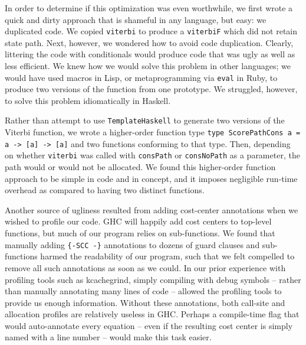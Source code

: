 \documentclass[preprint]{sigplanconf}
\begin{document}
In order to determine if this optimization was even worthwhile, we first wrote 
a quick and dirty approach that is shameful in any language, but easy: we 
duplicated code. We copied \texttt{viterbi} to produce a \texttt{viterbiF} 
which did not retain state path. Next, however, we wondered how to avoid code 
duplication. Clearly, littering the code with conditionals would produce code 
that was ugly as well as less efficient. We knew how we would solve this 
problem in other languages; we would have used macros in Lisp, or 
metaprogramming via \texttt{eval} in Ruby, to produce two versions of the 
function from one prototype. We struggled, however, to solve this problem 
idiomatically in Haskell.

Rather than attempt to use \texttt{TemplateHaskell} to generate two versions of 
the Viterbi function, we wrote a higher-order function type 
\lstinline!type ScorePathCons a = a -> [a] -> [a]! and two functions conforming to that type. 
Then, depending on whether \texttt{viterbi} was called with \texttt{consPath} 
or \texttt{consNoPath} as a parameter, the path would or would not be 
allocated. We found this higher-order function approach to be simple in code 
and in concept, and it imposes negligible run-time overhead as compared to 
having two distinct functions.



Another source of ugliness resulted from adding cost-center annotations when we 
wished to profile our code. GHC will happily add cost centers to top-level 
functions, but much of our program relies on sub-functions. We found that 
manually adding \texttt{\{-SCC -\}} annotations to dozens of guard clauses and 
sub-functions harmed the readability of our program, such that we felt 
compelled to remove all such annotations as soon as we could. In our prior 
experience with profiling tools such as kcachegrind, simply compiling with 
debug symbols -- rather than manually annotating many lines of code -- allowed 
the profiling tools to provide us enough information. Without these 
annotations, both call-site and allocation profiles are relatively useless in 
GHC. Perhaps a compile-time flag that would auto-annotate every equation -- 
even if the resulting cost center is simply named with a line number -- would 
make this task easier.
\end{document}
